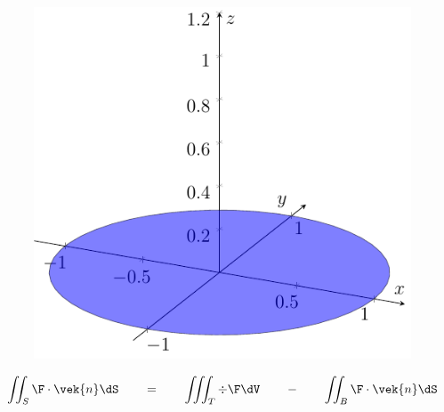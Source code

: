 \begin{frame}
\begin{figure}[ht]
\begin{minipage}[b]{0.30\linewidth}
        \end{minipage}
        \hspace{0.30cm}
        \begin{minipage}[b]{0.30\linewidth}
            \centering
            \includegraphics[width=\textwidth]{../img/2-Bunn.pdf}
        \end{minipage}
    \end{figure}
\begin{align*}
    \iint_{S} \F \cdot \vek{n} \dS
    \qquad =  \qquad 
    \iiint_{T} \div \F \dV 
    \qquad - \qquad  
    \iint_{B} \F \cdot \vek{n} \dS
\end{align*}
\end{frame}


